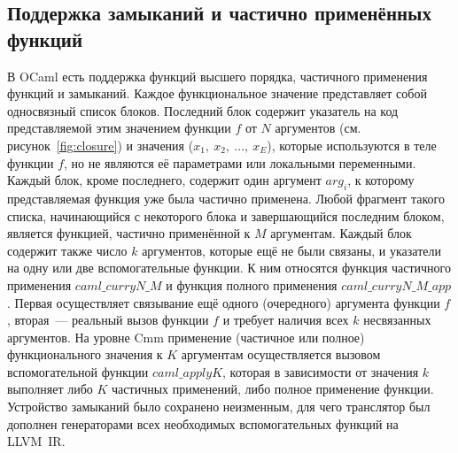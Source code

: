 \documentclass[a4paper, 12pt]{article}
\begin{document}
\subsection{Поддержка замыканий и частично применённых функций}
В OCaml есть поддержка функций высшего порядка, частичного применения функций и замыканий. Каждое функциональное
значение представляет собой односвязный список блоков. Последний блок содержит указатель на код представляемой этим
значением функции $f$ от $N$ аргументов (см. рисунок~\ref{fig:closure}) и значения ($x_1,~x_2,~\dots,~x_{E}$), которые
используются в теле функции $f$, но не являются её параметрами или локальными
переменными. Каждый блок, кроме последнего, содержит один аргумент $arg_i$, к которому представляемая функция уже была
частично применена. Любой фрагмент такого списка, начинающийся с некоторого блока и завершающийся последним блоком,
является функцией, частично применённой к $M$ аргументам. Каждый блок содержит также число $k$ аргументов, которые
ещё не были связаны, и указатели на одну или две вспомогательные функции. К ним относятся функция частичного применения
$caml\_curryN\_M$ и функция полного применения $caml\_curryN\_M\_app$. Первая осуществляет связывание ещё одного
(очередного) аргумента функции $f$, вторая~--- реальный вызов функции $f$ и требует наличия всех
$k$ несвязанных аргументов. На уровне Cmm применение (частичное или полное) функционального значения к $K$ аргументам
осуществляется вызовом вспомогательной функции $caml\_applyK$, которая в зависимости от значения $k$ выполняет либо
$K$ частичных применений, либо полное применение функции. Устройство замыканий было сохранено неизменным, для чего
транслятор был дополнен генераторами всех необходимых вспомогательных функций на LLVM~IR.
\end{document}
